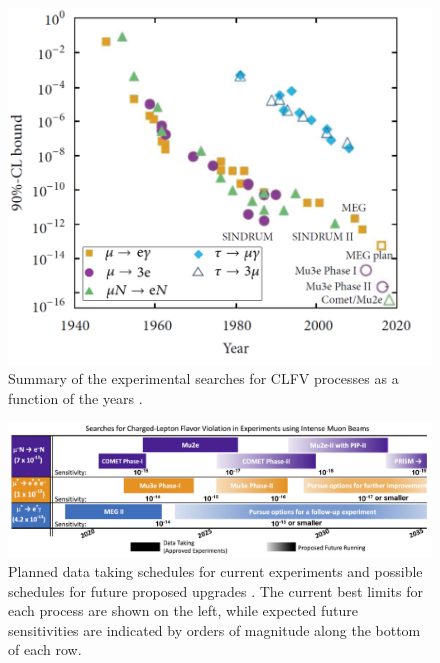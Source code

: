 \documentclass[12pt,a4paper,openright, oneside, titlepage]{book} %
\begin{document}
\begin{figure}[h!]
\centering
\includegraphics[scale=0.7]{timeline_measures}
\caption{Summary of the experimental searches for CLFV processes as a function of the years \cite{Chiappini}.}
\label{timeline_measures}
\end{figure}

\begin{figure}[h!]
\centering
\includegraphics[scale=0.5]{timeline_future}
\caption{Planned data taking schedules for current experiments and possible schedules for future proposed upgrades \cite{Baldini:2019}. The current best limits for each process are shown on the left, 
while expected future sensitivities are indicated by orders of magnitude along the bottom of each row.}
\label{_timeline_future}
\end{figure}
\end{document}
